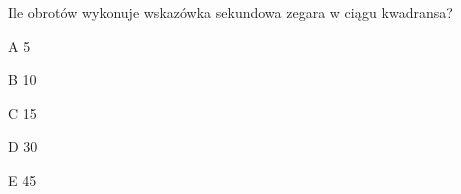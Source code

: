\begin{tresc}
Ile obrotów wykonuje wskazówka sekundowa zegara w ciągu kwadransa?
\end{tresc}
\begin{wariant}{A} 5 \end{wariant}
\begin{wariant}{B} 10 \end{wariant}
\begin{wariant}{C} 15 \end{wariant}
\begin{wariant}{D} 30 \end{wariant}
\begin{wariant}{E} 45 \end{wariant}
